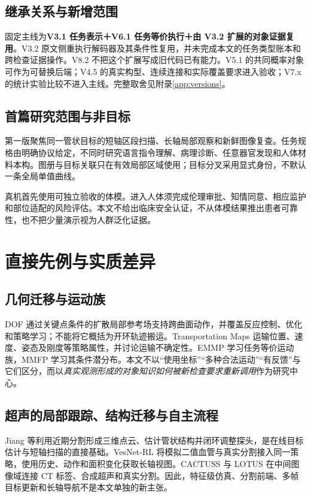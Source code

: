 \documentclass[UTF8,11pt,a4paper,fontset=fandol]{ctexart}
\numberwithin{equation}{section}
\theoremstyle{definition}
\begin{document}
\subsection{继承关系与新增范围}
固定主线为\textbf{V3.1 任务表示＋V6.1 任务等价执行＋由 V3.2 扩展的对象证据复用}。V3.2 原文侧重执行解码器及其条件性复用，并未完成本文的任务类型账本和跨检查证据操作。V8.2 不把这个扩展写成旧代码已有能力。V5.1 的共同概率对象可作为可替换后端；V4.5 的真实构型、连续连接和实际覆盖要求进入验收；V7.x 的统计实验比较不进入主线。完整取舍见附录\ref{app:versions}。

\subsection{首篇研究范围与非目标}
第一版聚焦同一管状目标的短轴区段扫描、长轴局部观察和新鲜图像复查。任务规格由明确协议给定，不同时研究语言指令理解、病理诊断、任意器官发现和人体材料本构。图册与目标关联只在有效局部区域使用；目标分叉采用显式身份，不默认一条全局单值曲线。

真机首先使用可独立验收的体模。进入人体须完成伦理审批、知情同意、相应监护和部位适配的风险评估。本文不给出临床安全认证，不从体模结果推出患者可靠性，也不把少量演示视为人群泛化证据。

\section{直接先例与实质差异}
\label{sec:related}
\subsection{几何迁移与运动族}
DOF 通过关键点条件的扩散局部参考场支持跨曲面动作，并覆盖反应控制、优化和策略学习；不能将它概括为开环轨迹搬运\cite{dof}。Transportation Maps 运输位置、速度、姿态及刚度等策略属性，并讨论运输不确定性\cite{transport}。EMMP 学习任务等价运动族，MMFP 学习其条件潜分布\cite{emmp,mmfp}。本文不以“使用坐标”“多种合法运动”“有反馈”与它们区分，而以\emph{真实观测形成的对象知识如何被新检查要求重新调用}作为研究中心。

\subsection{超声的局部跟踪、结构迁移与自主流程}
Jiang 等利用近期分割形成三维点云、估计管状结构并闭环调整探头，是在线目标估计与短轴扫描的直接基础\cite{tubular}。VesNet-RL 将模拟二值血管与真实分割接入同一策略，使用历史、动作和面积变化获取长轴视图\cite{vesnet}。CACTUSS 与 LOTUS 在中间图像域连接 CT 标签、合成超声和真实分割\cite{cactuss,lotus}。因此，特征级仿真、分割前端、多帧目标更新和长轴导航不是本文单独的新主张。
\end{document}

